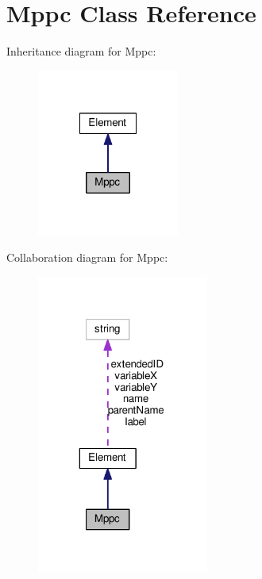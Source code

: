 \hypertarget{classMppc}{\section{Mppc Class Reference}
\label{classMppc}
}


Inheritance diagram for Mppc\+:\nopagebreak
\begin{figure}[H]
\begin{center}
\leavevmode
\includegraphics[width=132pt]{classMppc__inherit__graph}
\end{center}
\end{figure}


Collaboration diagram for Mppc\+:\nopagebreak
\begin{figure}[H]
\begin{center}
\leavevmode
\includegraphics[width=160pt]{classMppc__coll__graph}
\end{center}
\end{figure}
